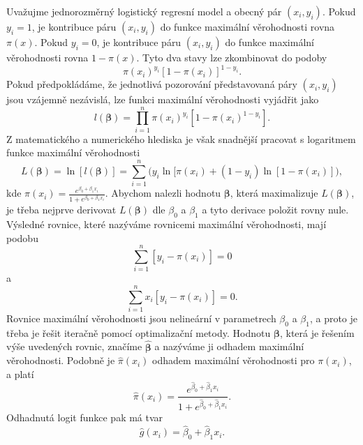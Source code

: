 Uvažujme jednorozměrný logistický regresní model a obecný pár $(x_i, y_i)$. Pokud $y_i = 1$, je kontribuce páru $(x_i, y_i)$ do funkce maximální věrohodnosti rovna $\pi(x)$. Pokud $y_i = 0$, je kontribuce páru $(x_i, y_i)$ do funkce maximální věrohodnosti rovna $1 - \pi(x)$. Tyto dva stavy lze zkombinovat do podoby
\begin{equation}
\pi(x_i)^{y_i}[1 - \pi(x_i)]^{1 - y_i}.
\end{equation}
Pokud předpokládáme, že jednotlivá pozorování představovaná páry $(x_i, y_i)$ jsou vzájemně nezávislá, lze funkci maximální věrohodnosti vyjádřit jako
\begin{equation}
l(\pmb{\beta}) = \prod_{i = 1}^n \pi(x_i)^{y_i}[1 - \pi(x_i)^{1 - y_i}].
\end{equation}
Z matematického a numerického hlediska je však snadnější pracovat s logaritmem funkce maximální věrohodnosti
\begin{equation}
L(\pmb{\beta}) = \ln[l(\pmb{\beta})] = \sum_{i = 1}^n \Big(y_i \ln[\pi(x_i) + (1 - y_i) \ln[1 - \pi(x_i)] \Big),
\end{equation}
kde $\pi(x_i) = \frac{e^{\beta_0 + \beta_1 x_i}}{1 + e^{\beta_0 + \beta_1 x_i}}$. Abychom nalezli hodnotu $\pmb{\beta}$, která maximalizuje $L(\pmb{\beta})$, je třeba nejprve derivovat $L(\pmb{\beta})$ dle $\beta_0$ a $\beta_1$ a tyto derivace položit rovny nule. Výsledné rovnice, které nazýváme rovnicemi maximální věrohodnosti, mají podobu
\begin{equation}
\sum_{i = 1}^n [y_i - \pi(x_i)] = 0
\end{equation}
a
\begin{equation}
\sum_{i = 1}^n x_i [y_i - \pi(x_i)] = 0.
\end{equation}
Rovnice maximální věrohodnosti jsou nelineární v parametrech $\beta_0$ a $\beta_1$, a proto je třeba je řešit iteračně pomocí optimalizační metody. Hodnotu $\pmb{\beta}$, která je řešením výše uvedených rovnic, značíme $\hat{\pmb{\beta}}$ a nazýváme ji odhadem maximální věrohodnosti. Podobně je $\hat{\pi}(x_i)$ odhadem maximální věrohodnosti pro $\pi(x_i)$, a platí
\begin{equation}
\hat{\pi}(x_i) = \frac{e^{\hat{\beta}_0 + \hat{\beta}_1 x_i}}{1 + e^{\hat{\beta}_0 + \hat{\beta}_1 x_i}}.
\end{equation}
Odhadnutá logit funkce pak má tvar
\begin{equation}
\hat{g}(x_i) = \hat{\beta}_0 + \hat{\beta}_1 x_i.
\end{equation}

